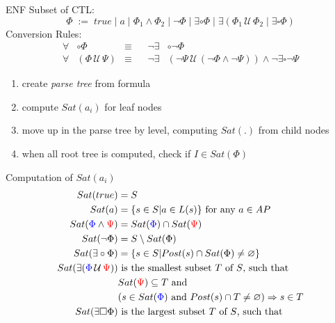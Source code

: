 \documentclass[a4paper, 10pt]{article}
\newcommand{\until}{\,\mathcal{U}\,}
\begin{document}
\begin{mdframed}[roundcorner=5pt,
subtitlebelowline=false,subtitleaboveline=false,
subtitlebackgroundcolor=blue!30,
frametitlerule=true,
frametitlebackgroundcolor=blue!30,
frametitle={ENF Conversion}
]
ENF Subset of CTL:
\[ \Phi\;:=\;true\;|\;a\;|\;\Phi_1\wedge\Phi_2\;|\;\neg\Phi\;|\;\exists\circ\Phi\;|\;\exists(\Phi_1\until\Phi_2\;|\;\exists\square\Phi) \]
Conversion Rules:
\begin{align*}
\forall&\circ\Phi &\equiv&& \neg\exists&\circ\neg\Phi \\
\forall&(\Phi\until\Psi) &\equiv&& \neg\exists&(\neg\Psi\until(\neg\Phi\wedge\neg\Psi))\wedge\neg\exists\square\neg\Psi
\end{align*}
\begin{multicols}{2}
\begin{enumerate}
    \item create \emph{parse tree} from formula
    \item compute $Sat(a_i)$ for leaf nodes
    \item move up in the parse tree by level, computing $Sat(.)$ from child nodes
    \item when all root tree is computed, check if $I\in Sat(\Phi)$
\end{enumerate}
\begin{center}
\scalebox{1}{}
\end{center}
\end{multicols}
Computation of $Sat(a_i)$
\begin{align*}
Sat(true) &= S \\
Sat(a) &= \{s\in S | a\in L(s)\} \text{ for any } a\in AP \\
Sat(\blue\Phi\wedge\red\Psi) &= Sat(\blue\Phi) \cap Sat(\red\Psi) \\
Sat(\neg\Phi) &= S\setminus Sat(\Phi) \\
Sat(\exists\circ\Phi) &= \{s\in S | Post(s)\cap Sat(\Phi)\not=\varnothing\} \\
%
Sat(\exists(\blue\Phi\until\red\Psi)) &\text{ is the smallest subset $T$ of $S$, such that } \\
&Sat(\red\Psi)\subseteq T \text{ and} \\
&(s\in Sat(\blue\Phi) \text{ and } Post(s)\cap T\not=\varnothing)\Rightarrow s\in T \\
%
Sat(\exists\square\Phi) &\text{ is the largest subset $T$ of $S$, such that} \\

\end{align*}
\end{mdframed}
\end{document}
